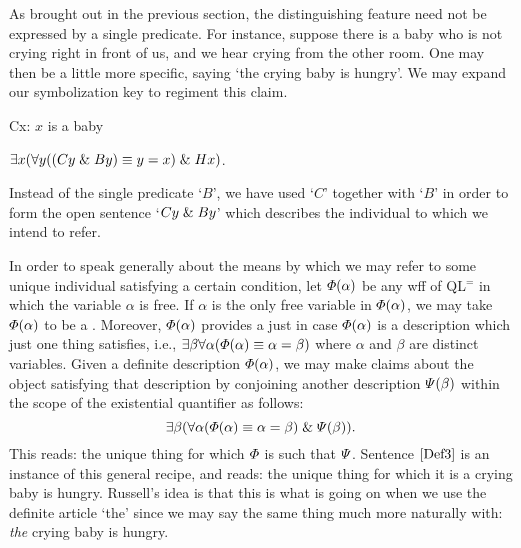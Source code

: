 As brought out in the previous section, the distinguishing feature need not be expressed by a single predicate.
For instance, suppose there is a baby who is not crying right in front of us, and we hear crying from the other room.
One may then be a little more specific, saying `the crying baby is hungry'.
We may expand our symbolization key to regiment this claim.

\begin{multicols}{2}

\begin{ekey}
  \item[Cx:] $x$ is a baby
\end{ekey}

\begin{earg}
  \item[\ex{Def3}] $\exists x (\forall y ((Cy \mathrel\& By) \equiv y = x) \mathrel\& Hx)$.
\end{earg}

\end{multicols}

Instead of the single predicate `$B$', we have used `$C$' together with `$B$' in order to form the open sentence `$Cy \mathrel\& By$' which describes the individual to which we intend to refer.

In order to speak generally about the means by which we may refer to some unique individual satisfying a certain condition, let $\varPhi(\alpha)$ be any wff of QL$^=$ in which the variable $\alpha$ is free. 
If $\alpha$ is the only free variable in $\varPhi(\alpha)$, we may take $\varPhi(\alpha)$ to be a .
Moreover, $\varPhi(\alpha)$ provides a  just in case $\varPhi(\alpha)$ is a description which just one thing satisfies, i.e., $\exists \beta\forall \alpha(\varPhi(\alpha)\equiv \alpha = \beta)$ where $\alpha$ and $\beta$ are distinct variables.
Given a definite description $\varPhi(\alpha)$, we may make claims about the object satisfying that description by conjoining another description $\varPsi(\beta)$ within the scope of the existential quantifier as follows: 
  $$\exists \beta(\forall \alpha(\varPhi(\alpha)\equiv \alpha = \beta) \mathrel\& \varPsi(\beta)).$$
This reads: the unique thing for which $\varPhi$ is such that $\varPsi$.
Sentence $\ref{Def3}$ is an instance of this general recipe, and reads: the unique thing for which it is a crying baby is hungry. 
Russell's idea is that this is what is going on when we use the definite article `the' since we may say the same thing much more naturally with: \textit{the} crying baby is hungry.

